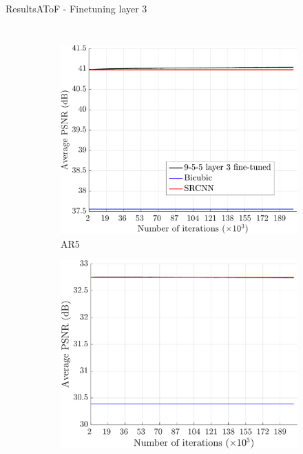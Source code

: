 \begin{frame}{Results}{AToF - Finetuning layer 3}
    \begin{columns}
        \begin{figure}
            \centering
            \begin{subfigure}[b]{0.48\textwidth}
                \includegraphics[width=\textwidth]{sections/malte_slides/atof-l3-results-aleix5.pdf}
                \vspace*{-2mm}
                \caption*{\scriptsize AR5}
            \end{subfigure}
            \begin{subfigure}[b]{0.48\textwidth}
                \includegraphics[width=\textwidth]{sections/malte_slides/atof-l3-results-set5.pdf}

\end{subfigure}
\end{figure}
\end{columns}
\end{frame}
